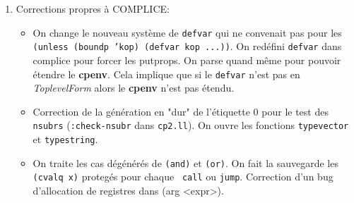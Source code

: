 \begin {enumerate}
\begin {itemize}
\item Traduction du noyau KerN en assembleur au format MOTOROLA sur
68K permettant l'introduction ais\'{e}e de KerN en assembleur sur la
majorit\'{e} des portages 68K. Nous gagnons ainsi un rapport 2 en vitesse
d'ex\'{e}cution des primitives de KerN sur ces machines.

\item Mise au point d'un certain nombre de flags s\'{e}mantiques de
compilation C sur les portages UNIX : 
LLPAGESIZE (taille des pages m\'{e}moire), LLTIMEUNIT
(fr\'{e}quence d'horloge), EXECORE (cores executables), CLOAD/NOCLOAD
(loader dynamique), ITINREAD (IT \`{a} la lecture), LLFOREGROUND (process
en foreground), LLVFORK (vfork ou non), LLRENAME (proc\'{e}dure rename
existe ou non). Et toujours: BSD4x et S5. Introduction du flag POSIX:
ce dernier devra prendre de plus en plus d'importance. \\
Cette manipulation des flags offre une plus grande lisibilit\'{e} du code
C,  permet une automatisation plus ais\'{e}e de la
g\'{e}n\'{e}ration de fichiers, mais surtout facilite l'introduction de
nouveaux portages.

\end {itemize}

\item Corrections propres \`{a} COMPLICE:

\begin {itemize}

\item
On change le nouveau syst\`{e}me de {\tt defvar} qui ne convenait pas
pour les {\tt (unless (boundp 'kop) (defvar kop ...))}. On red\'{e}fini
{\tt defvar} dans complice pour forcer les putprops. On parse quand m\^{e}me
pour pouvoir \'{e}tendre le {\bf cpenv}. Cela implique que si le
{\tt defvar} n'est pas en {\it ToplevelForm} alors le {\bf cpenv}
n'est pas \'{e}tendu. 

\item
Correction de la g\'{e}n\'{e}ration en "dur" de l'\'{e}tiquette 0 pour le
test des {\tt nsubrs} ({\tt :check-nsubr} dans {\tt cp2.ll}).
On ouvre les fonctions {\tt typevector} et {\tt typestring}.

\item
On traite les cas d\'{e}g\'{e}n\'{e}r\'{e}s de {\tt (and)} et {\tt (or)}.
On fait la sauvegarde les {\tt (cvalq x)} proteg\'{e}s pour chaque {\tt
call} ou {\tt jump}.
Correction d'un bug d'allocation de registres dans (arg <expr>).

\end{itemize}
\end{enumerate}

